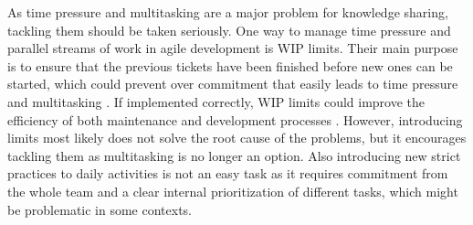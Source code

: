 As time pressure and multitasking are a major problem for knowledge sharing, tackling them should be taken seriously. One way to manage time pressure and parallel streams
of work in agile development is WIP limits. Their main purpose is to ensure that the previous tickets have been finished before new ones can be started, which could prevent over commitment
that easily leads to time pressure and multitasking \citep{Ahmad2016}. If implemented correctly, WIP limits could improve the efficiency of both maintenance and development processes \citep{Concas2013}.
However, introducing limits most likely does not solve the root cause of the problems, but it encourages tackling them as multitasking is no longer an option. Also introducing new strict
practices to daily activities is not an easy task as it requires commitment from the whole team \citep{Ahmad2013} and a clear internal prioritization of different tasks, which might be
problematic in some contexts.

